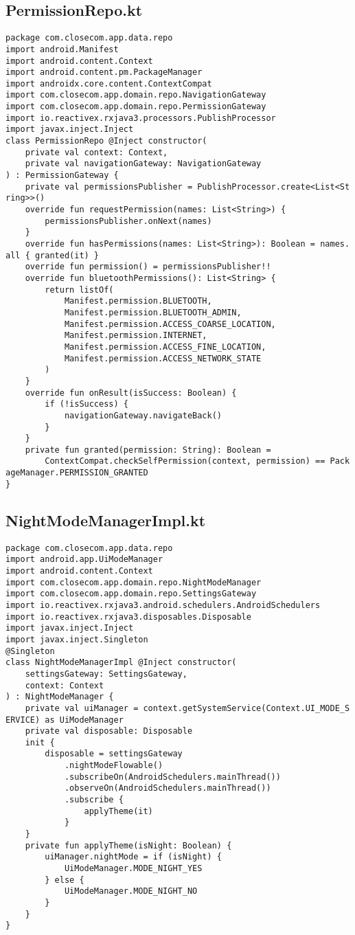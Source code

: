 \documentclass[listing]{espd}
\begin{document}
\subsection{PermissionRepo.kt}
\begin{verbatim}
package com.closecom.app.data.repo
import android.Manifest
import android.content.Context
import android.content.pm.PackageManager
import androidx.core.content.ContextCompat
import com.closecom.app.domain.repo.NavigationGateway
import com.closecom.app.domain.repo.PermissionGateway
import io.reactivex.rxjava3.processors.PublishProcessor
import javax.inject.Inject
class PermissionRepo @Inject constructor(
    private val context: Context,
    private val navigationGateway: NavigationGateway
) : PermissionGateway {
    private val permissionsPublisher = PublishProcessor.create<List<St
ring>>()
    override fun requestPermission(names: List<String>) {
        permissionsPublisher.onNext(names)
    }
    override fun hasPermissions(names: List<String>): Boolean = names.
all { granted(it) }
    override fun permission() = permissionsPublisher!!
    override fun bluetoothPermissions(): List<String> {
        return listOf(
            Manifest.permission.BLUETOOTH,
            Manifest.permission.BLUETOOTH_ADMIN,
            Manifest.permission.ACCESS_COARSE_LOCATION,
            Manifest.permission.INTERNET,
            Manifest.permission.ACCESS_FINE_LOCATION,
            Manifest.permission.ACCESS_NETWORK_STATE
        )
    }
    override fun onResult(isSuccess: Boolean) {
        if (!isSuccess) {
            navigationGateway.navigateBack()
        }
    }
    private fun granted(permission: String): Boolean =
        ContextCompat.checkSelfPermission(context, permission) == Pack
ageManager.PERMISSION_GRANTED
}
\end{verbatim}

\subsection{NightModeManagerImpl.kt}
\begin{verbatim}
package com.closecom.app.data.repo
import android.app.UiModeManager
import android.content.Context
import com.closecom.app.domain.repo.NightModeManager
import com.closecom.app.domain.repo.SettingsGateway
import io.reactivex.rxjava3.android.schedulers.AndroidSchedulers
import io.reactivex.rxjava3.disposables.Disposable
import javax.inject.Inject
import javax.inject.Singleton
@Singleton
class NightModeManagerImpl @Inject constructor(
    settingsGateway: SettingsGateway,
    context: Context
) : NightModeManager {
    private val uiManager = context.getSystemService(Context.UI_MODE_S
ERVICE) as UiModeManager
    private val disposable: Disposable
    init {
        disposable = settingsGateway
            .nightModeFlowable()
            .subscribeOn(AndroidSchedulers.mainThread())
            .observeOn(AndroidSchedulers.mainThread())
            .subscribe {
                applyTheme(it)
            }
    }
    private fun applyTheme(isNight: Boolean) {
        uiManager.nightMode = if (isNight) {
            UiModeManager.MODE_NIGHT_YES
        } else {
            UiModeManager.MODE_NIGHT_NO
        }
    }
}
\end{verbatim}
\end{document}
